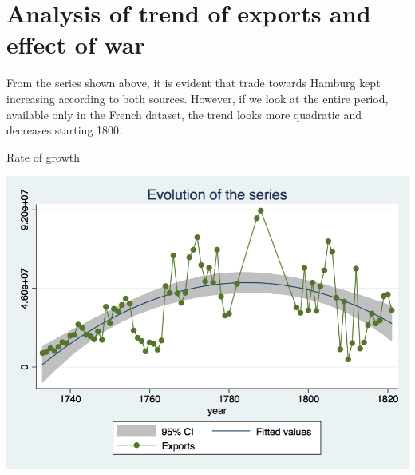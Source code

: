 \documentclass[12pt,a4paper,titlepage,english]{article}
\begin{document}
\section{Analysis of trend of exports and effect of war}
From the series shown above, it is evident that trade towards Hamburg kept increasing according to both sources. However, if we look at the entire period, available only in the French dataset, the trend looks more quadratic and decreases starting 1800. 
\begin{center}
\caption{Rate of growth}
\includegraphics[scale=.3]{growth_rate.png}
\end{center}
\end{document}
